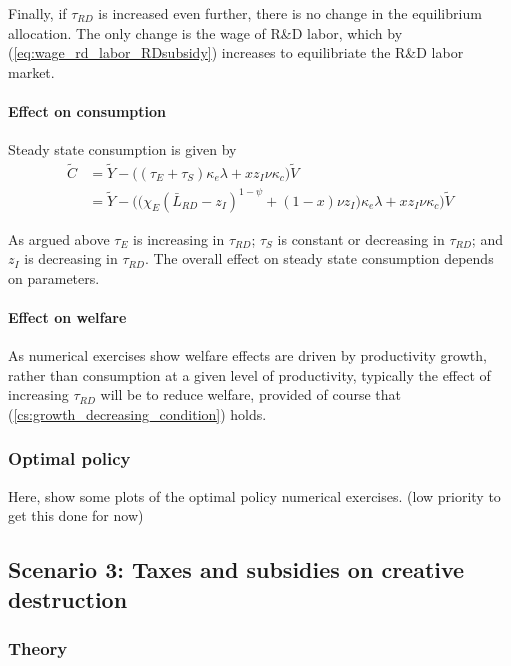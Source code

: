 \documentclass[11pt,english]{article}
\theoremstyle{remark}
\begin{document}
Finally, if $\tau_{RD}$ is increased even further, there is no change in the equilibrium allocation. The only change is the wage of R\&D labor, which by (\ref{eq:wage_rd_labor_RDsubsidy}) increases to equilibriate the R\&D labor market.

\paragraph{Effect on consumption}

Steady state consumption is given by
\begin{align*}
\tilde{C} &= \tilde{Y} - \Big( (\tau_E  + \tau_S)\kappa_e \lambda + x z_I \nu \kappa_c \Big) \tilde{V} \\
&= \tilde{Y} - \Big( \big( \chi_E (\bar{L}_{RD} - z_I)^{1-\psi} + (1-x) \nu z_I \big) \kappa_e \lambda + x z_I \nu \kappa_c \Big) \tilde{V}  \label{cs:scen2:consumption_eq}
\end{align*}

As argued above $\tau_E$ is increasing in $\tau_{RD}$; $\tau_S$ is constant or decreasing in $\tau_{RD}$; and $z_I$ is decreasing in $\tau_{RD}$. The overall effect on steady state consumption depends on parameters. 

\paragraph{Effect on welfare}

As numerical exercises show welfare effects are driven by productivity growth, rather than consumption at a given level of productivity, typically the effect of increasing $\tau_{RD}$ will be to reduce welfare, provided of course that (\ref{cs:growth_decreasing_condition}) holds.



\subsubsection{Optimal policy}

Here, show some plots of the optimal policy numerical exercises. (low priority to get this done for now)

\subsection{Scenario 3: Taxes and subsidies on creative destruction}



\subsubsection{Theory}
\end{document}
